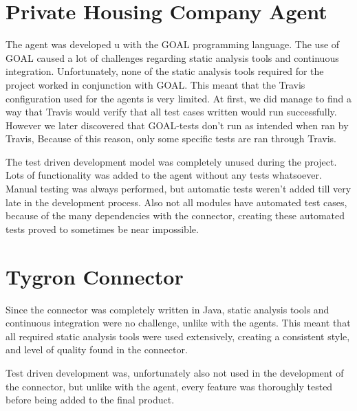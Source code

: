 \section{Private Housing Company Agent}
\label{sub:Private Housing Company Agent}

The agent was developed u with the GOAL programming language. The use of GOAL caused a lot of challenges regarding static analysis tools and continuous integration.
Unfortunately, none of the static analysis tools required for the project worked in conjunction with GOAL. This meant that the Travis configuration used for the agents is very limited.
At first, we did manage to find a way that Travis would verify that all test cases written would run successfully. However we later discovered that GOAL-tests don't run as intended when ran by Travis,
Because of this reason, only some specific tests are ran through Travis.

The test driven development model was completely unused during the project. Lots of functionality was added to the agent without any tests whatsoever. Manual testing was always performed, but automatic
tests weren't added till very late in the development process. Also not all modules have automated test cases, because of the many dependencies with the connector, creating these automated tests proved
to sometimes be near impossible.

\section{Tygron Connector}
\label{sub:Tygron Connector}

Since the connector was completely written in Java, static analysis tools and continuous integration were no challenge, unlike with the agents. This meant that all required static analysis tools were
used extensively, creating a consistent style, and level of quality found in the connector.

Test driven development was, unfortunately also not used in the development of the connector, but unlike with the agent, every feature was thoroughly tested before being added to the final product.
